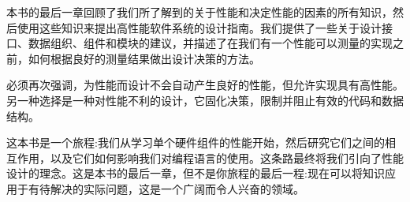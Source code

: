 本书的最后一章回顾了我们所了解到的关于性能和决定性能的因素的所有知识，然后使用这些知识来提出高性能软件系统的设计指南。我们提供了一些关于设计接口、数据组织、组件和模块的建议，并描述了在我们有一个性能可以测量的实现之前，如何根据良好的测量结果做出设计决策的方法。

必须再次强调，为性能而设计不会自动产生良好的性能，但允许实现具有高性能。另一种选择是一种对性能不利的设计，它固化决策，限制并阻止有效的代码和数据结构。

这本书是一个旅程:我们从学习单个硬件组件的性能开始，然后研究它们之间的相互作用，以及它们如何影响我们对编程语言的使用。这条路最终将我们引向了性能设计的理念。这是本书的最后一章，但不是你旅程的最后一程:现在可以将知识应用于有待解决的实际问题，这是一个广阔而令人兴奋的领域。